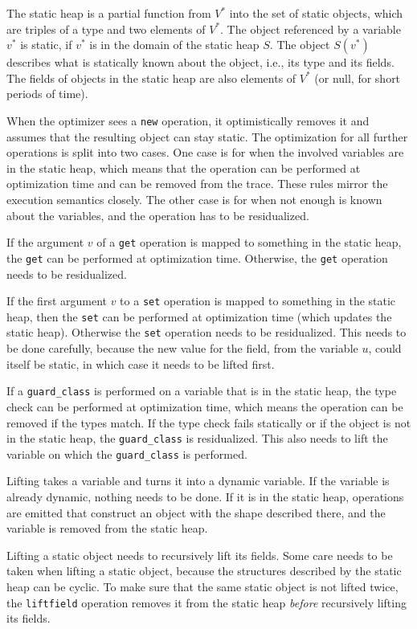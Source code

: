 \documentclass{sigplanconf}
\newcommand\ie{i.e.,\xspace}
\begin{document}
The static heap is a partial function from $V^*$ into the
set of static objects, which are triples of a type and two elements of $V^*$.
The object referenced by a variable $v^*$ is static, if $v^*$ is in the domain
of the static heap $S$. The object $S(v^*)$ describes
what is statically known about the object, \ie its type and its fields. The
fields of objects in the static heap are also elements of $V^*$ (or null, for
short periods of time).

When the optimizer sees a \lstinline{new} operation, it optimistically removes it and
assumes that the resulting object can stay static. The optimization for all
further operations is split into two cases. One case is for when the
involved variables are in the static heap, which means that the operation can be
performed at optimization time and can be removed from the trace. These rules mirror
the execution semantics closely. The other case is for when not enough is known about
the variables, and the operation has to be residualized.

If the argument $v$ of a \lstinline{get} operation is mapped to something in the static
heap, the \lstinline{get} can be performed at optimization time. Otherwise, the \lstinline{get}
operation needs to be residualized.

If the first argument $v$ to a \lstinline{set} operation is mapped to something in the
static heap, then the \lstinline{set} can be performed at optimization time
(which updates the static heap). Otherwise the \lstinline{set} operation needs
to be residualized. This needs to be
done carefully, because the new value for the field, from the variable $u$,
could itself be static, in which case it needs to be lifted first.

If a \lstinline{guard_class} is performed on a variable that is in the static heap, the type check
can be performed at optimization time, which means the operation can be removed
if the types match. If the type check fails statically or if the object is not
in the static heap, the \lstinline{guard_class} is residualized. This also needs to
lift the variable on which the \lstinline{guard_class} is performed.

Lifting takes a variable and turns it into a dynamic variable. If the variable
is already dynamic, nothing needs to be done. If it is in the static heap,
operations are emitted that construct an object with the shape described
there, and the variable is removed from the static heap.

Lifting a static object needs to recursively lift its fields. Some care needs to
be taken when lifting a static object, because the structures described by the
static heap can be cyclic. To make sure that the same static object is not lifted
twice, the \lstinline{liftfield} operation removes it from the static heap \emph{before}
recursively lifting its fields.
\end{document}
